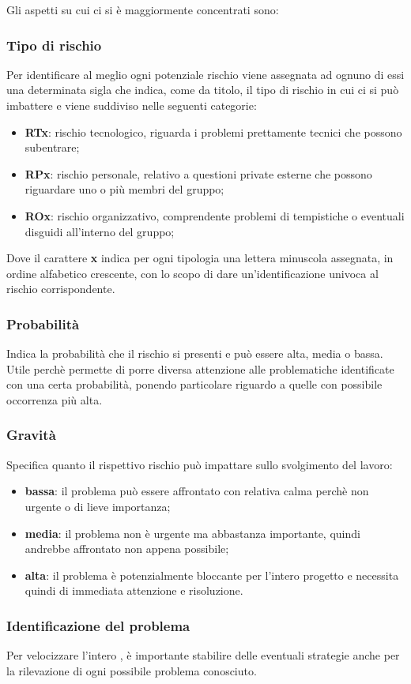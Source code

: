 Gli aspetti su cui ci si è maggiormente concentrati sono:

\subsubsection{Tipo di rischio}
    Per identificare al meglio ogni potenziale rischio viene assegnata ad ognuno di essi una determinata sigla che indica, come da titolo, il tipo di rischio in cui ci si può imbattere e viene suddiviso nelle seguenti categorie:
    \begin{itemize}
        \item \textbf{RTx}: rischio tecnologico, riguarda i problemi prettamente tecnici che possono subentrare;
        \item \textbf{RPx}: rischio personale, relativo a questioni private esterne che possono riguardare uno o più membri del gruppo;
        \item \textbf{ROx}: rischio organizzativo, comprendente problemi di tempistiche o eventuali disguidi all'interno del gruppo;
    \end{itemize}
    Dove il carattere \textbf{x} indica per ogni tipologia una lettera minuscola assegnata, in ordine alfabetico crescente, con lo scopo di dare un'identificazione univoca al rischio corrispondente.
    
\subsubsection{Probabilità}
    Indica la probabilità che il rischio si presenti e può essere alta, media o bassa. Utile perchè permette di porre diversa attenzione alle problematiche identificate con una certa probabilità, ponendo particolare riguardo a quelle con possibile occorrenza più alta.

\subsubsection{Gravità}
    Specifica quanto il rispettivo rischio può impattare sullo svolgimento del lavoro:
    \begin{itemize}
        \item \textbf{bassa}: il problema può essere affrontato con relativa calma perchè non urgente o di lieve importanza;
        \item \textbf{media}: il problema non è urgente ma abbastanza importante, quindi andrebbe affrontato non appena possibile;
        \item \textbf{alta}: il problema è potenzialmente bloccante per l'intero progetto e necessita quindi di immediata attenzione e risoluzione.
    \end{itemize}
    
\subsubsection{Identificazione del problema}
    Per velocizzare l'intero , è importante stabilire delle eventuali strategie anche per la rilevazione di ogni possibile problema conosciuto.